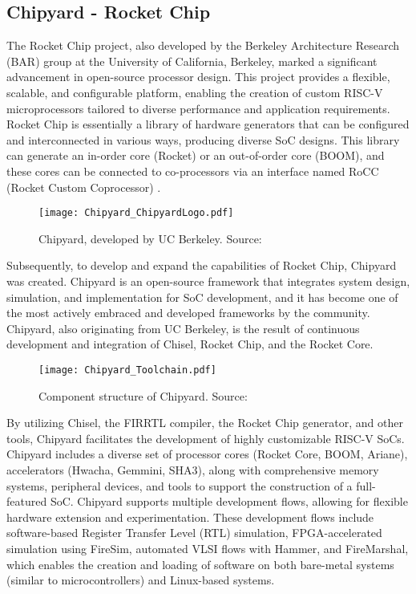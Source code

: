 \subsection{Chipyard - Rocket Chip}

The Rocket Chip project, also developed by the Berkeley Architecture Research (BAR) group at the University of California, Berkeley, marked a significant advancement in open-source processor design. This project provides a flexible, scalable, and configurable platform, enabling the creation of custom RISC-V microprocessors tailored to diverse performance and application requirements. Rocket Chip is essentially a library of hardware generators that can be configured and interconnected in various ways, producing diverse SoC designs. This library can generate an in-order core (Rocket) or an out-of-order core (BOOM), and these cores can be connected to co-processors via an interface named RoCC (Rocket Custom Coprocessor) \cite{asanovic2016rocket}.

\begin{figure}[h!]
    \centering
    \texttt{[image: Chipyard\_ChipyardLogo.pdf]} 
    \caption{Chipyard, developed by UC Berkeley. Source: \cite{zhao2021chipyard}}
    \label{fig:chipyard_ucb}
\end{figure}

Subsequently, to develop and expand the capabilities of Rocket Chip, Chipyard was created. Chipyard is an open-source framework that integrates system design, simulation, and implementation for SoC development, and it has become one of the most actively embraced and developed frameworks by the community. Chipyard, also originating from UC Berkeley, is the result of continuous development and integration of Chisel, Rocket Chip, and the Rocket Core.

\begin{figure}[h!]
    \centering
    \texttt{[image: Chipyard\_Toolchain.pdf]} %
    \caption{Component structure of Chipyard. Source: \cite{zhao2021chipyard}}
    \label{fig:chipyard_structure}
\end{figure}

By utilizing Chisel, the FIRRTL compiler, the Rocket Chip generator, and other tools, Chipyard facilitates the development of highly customizable RISC-V SoCs. Chipyard includes a diverse set of processor cores (Rocket Core, BOOM, Ariane), accelerators (Hwacha, Gemmini, SHA3), along with comprehensive memory systems, peripheral devices, and tools to support the construction of a full-featured SoC. Chipyard supports multiple development flows, allowing for flexible hardware extension and experimentation. These development flows include software-based Register Transfer Level (RTL) simulation, FPGA-accelerated simulation using FireSim, automated VLSI flows with Hammer, and FireMarshal, which enables the creation and loading of software on both bare-metal systems (similar to microcontrollers) and Linux-based systems.

